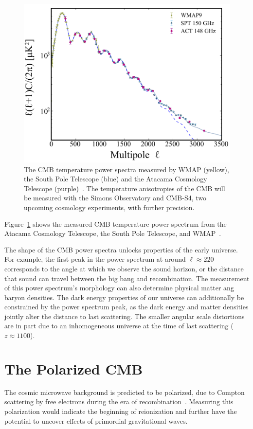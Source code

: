 \begin{figure}[t]
    \centering
    \includegraphics[width = .75\textwidth]{Figures/temp_power_spectrum.pdf}
    \caption{The CMB temperature power spectra measured by WMAP (yellow), the South Pole Telescope (blue) and the Atacama Cosmology Telescope (purple)~\cite{Das_2014}.  The temperature anisotropies of the CMB will be measured with the Simons Observatory and CMB-S4, two upcoming cosmology experiments, with further precision.}
    \label{fig:measured_cmb_spec}
\end{figure}

Figure~\ref{fig:measured_cmb_spec} shows the measured CMB temperature power spectrum from the Atacama Cosmology Telescope, the South Pole Telescope, and WMAP~\cite{Das_2014}.  

The shape of the CMB power spectra unlocks properties of the early universe.  For example, the first peak in the power spectrum at around $\ell\approx220$ corresponds to the angle at which we observe the sound horizon, or the distance that sound can travel between the big bang and recombination.  The measurement of this power spectrum's morphology can also determine physical matter ang baryon densities.  The dark energy properties of our universe can additionally be constrained by the power spectrum peak, as the dark energy and matter densities jointly alter the distance to last scattering.  The smaller angular scale distortions are in part due to an inhomogeneous universe at the time of last scattering ($z\approx 1100$). 

\section{The Polarized CMB}
The cosmic microwave background is predicted to be polarized, due to Compton scattering by free electrons during the era of recombination~\cite{}.  Measuring this polarization would indicate the beginning of reionization and further have the potential to uncover effects of primordial gravitational waves.

